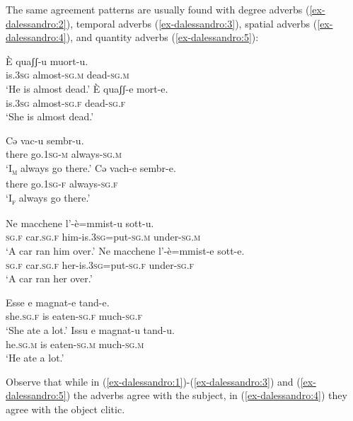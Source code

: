\documentclass[output=paper
,modfonts
,nonflat]{langsci/langscibook}
\begin{document}
The same agreement patterns are usually found with degree adverbs (\ref{ex-dalessandro:2}), temporal adverbs (\ref{ex-dalessandro:3}), spatial adverbs (\ref{ex-dalessandro:4}), and quantity adverbs (\ref{ex-dalessandro:5}):
\begin{exe}
	\ex \label{ex-dalessandro:2} \citet{Ledgeway2012} \xlist
	\ex 
	\gll  È   quaʃʃ-u    muort-u.\\
	is.3\textsc{sg} almost-\textsc{sg.m} dead-\textsc{sg.m}\\
	\glt `He is almost dead.' 
	\ex
	\gll  È   quaʃʃ-e     mort-e.\\
	is.3\textsc{sg} almost-\textsc{sg.f} dead-\textsc{sg.f}\\
	\glt `She is almost dead.' 
	\endxlist
\end{exe}
\begin{exe}
	\ex \label{ex-dalessandro:3}\xlist
	\ex \label{ex-dalessandro:3a}
	\gll  Cə   vac-u    sembr-u.\\
	there  go.1\textsc{sg-m} always-\textsc{sg.m}\\
	\glt `I\textsc{\textsubscript{m}} always go there.' 
	\ex \label{ex-dalessandro:3b}
	\gll Cə  vach-e    sembr-e.\\
	there  go.1\textsc{sg-f} always-\textsc{sg.f}\\
	\glt `I\textsc{\textsubscript{f}} always go there.' 
	\endxlist
\end{exe}
\begin{exe}
	\ex\label{ex-dalessandro:4} \xlist
	\ex 
	\gll Ne   macchene   l’-è=mmist-u    sott-u.\\
	\textsc{sg.f} car.\textsc{sg.f} him-is.\textsc{3sg=}put-\textsc{sg.m} under-\textsc{sg.m}\\
	\glt `A car ran him over.' 
	\ex
	\gll  Ne   macchene   l’-è=mmist-e    sott-e.\\
	\textsc{sg.f} car.\textsc{sg.f} her-is.\textsc{3sg=}put-\textsc{sg.f} under-\textsc{sg.f}\\
	\glt `A car ran her over.'  
	\endxlist
\end{exe}
\begin{exe}
	\ex \label{ex-dalessandro:5}\citet[45-46]{Lambertelli2003} \xlist
	\ex 
	\gll  Esse   e   magnat-e   tand-e.\\
	she.\textsc{sg.f} is  eaten-\textsc{sg.f} much-\textsc{sg.f}\\
	\glt `She ate a lot.' 
	\ex
	\gll Issu   e  magnat-u   tand-u.\\
	he.\textsc{sg.m} is  eaten-\textsc{sg.m} much-\textsc{sg.m}\\
	\glt `He ate a lot.' 
	\endxlist
\end{exe}
Observe that while in (\ref{ex-dalessandro:1})-(\ref{ex-dalessandro:3}) and (\ref{ex-dalessandro:5}) the adverbs agree with the subject, in (\ref{ex-dalessandro:4}) they agree with the object clitic. 
\end{document}
